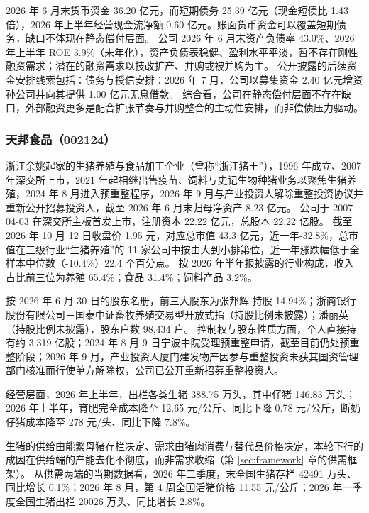  2026 年 6 月末货币资金 36.20 亿元，而短期债务 25.39 亿元（现金短债比 1.43 倍），2026 年上半年经营现金流净额 0.60 亿元。账面货币资金可以覆盖短期债务，缺口不体现在静态偿付层面。 公司 2026 年 6 月末资产负债率 43.0\%、2026 年上半年 ROE 3.9\%（未年化），资产负债表稳健、盈利水平平淡，暂不存在刚性融资需求；潜在的融资需求以技改扩产、并购或被并购为主。 公开披露的后续资金安排线索包括：债务与授信安排：2026 年 7 月，公司以募集资金 2.40 亿元增资孙公司并向其提供 1.00 亿元无息借款。 综合看，公司在静态偿付层面不存在缺口，外部融资更多是配合扩张节奏与并购整合的主动性安排，而非偿债压力驱动。




\subsubsection{天邦食品（002124）}
\label{co:002124}

 浙江余姚起家的生猪养殖与食品加工企业（曾称“浙江猪王”），1996 年成立、2007 年深交所上市，2021 年起相继出售疫苗、饲料与史记生物种猪业务以聚焦生猪养殖，2024 年 8 月进入预重整程序，2026 年 9 月与产业投资人解除重整投资协议并重新公开招募投资人，截至 2026 年 6 月末归母净资产 8.23 亿元。 公司于 2007-04-03 在深交所主板首发上市，注册资本 22.22 亿元，总股本 22.22 亿股。 截至 2026 年 10 月 12 日收盘价 1.95 元，对应总市值 43.3 亿元，近一年-32.8\%，总市值在三级行业“生猪养殖”的 11 家公司中按由大到小排第位，近一年涨跌幅低于全样本中位数（-10.4\%）22.4 个百分点。 按 2026 年半年报披露的行业构成，收入占比前三位为养殖 65.4\%；食品 31.4\%；饲料产品 3.2\%。

 按 2026 年 6 月 30 日的股东名册，前三大股东为张邦辉 持股 14.94\%；浙商银行股份有限公司－国泰中证畜牧养殖交易型开放式指（持股比例未披露）；潘丽英（持股比例未披露），股东户数 98,434 户。 控制权与股东性质方面，个人直接持有约 3.319 亿股；2024 年 8 月 9 日宁波中院受理预重整申请，截至目前仍处预重整阶段；2026 年 9 月，产业投资人厦门建发物产因参与重整投资未获其国资管理部门核准而行使单方解除权，公司已公开重新招募重整投资人。

 经营层面，2026 年上半年，出栏各类生猪 388.75 万头，其中仔猪 146.83 万头；2026 年上半年，育肥完全成本降至 12.65 元/公斤、同比下降 0.78 元/公斤，断奶仔猪成本降至 278 元/头、同比下降 7.8\%。

 生猪的供给由能繁母猪存栏决定、需求由猪肉消费与替代品价格决定，本轮下行的成因在供给端的产能去化不彻底，而非需求收缩（第 \ref{sec:framework} 章的供需框架）。 从供需两端的当期数据看，2026 年二季度，末全国生猪存栏 42491 万头、同比增长 0.1\%；2026 年 8 月，第 4 周全国活猪价格 11.55 元/公斤；2026 年一季度全国生猪出栏 20026 万头、同比增长 2.8\%。

